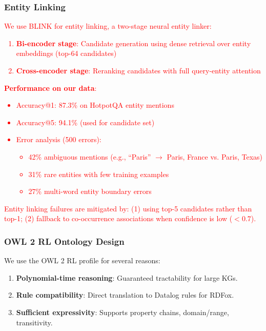 \documentclass[10pt,twocolumn]{article}
\newcommand{\revisioncritical}[1]{\textcolor{red}{#1}}
\begin{document}
\subsubsection{Entity Linking}
\label{sec:entity_linking}
\revisioncritical{

We use BLINK \cite{wu2020blink} for entity linking, a two-stage neural entity linker:

\begin{enumerate}
    \item \textbf{Bi-encoder stage}: Candidate generation using dense retrieval over entity embeddings (top-64 candidates)
    \item \textbf{Cross-encoder stage}: Reranking candidates with full query-entity attention
\end{enumerate}

\textbf{Performance on our data}:
\begin{itemize}
    \item Accuracy@1: 87.3\% on HotpotQA entity mentions
    \item Accuracy@5: 94.1\% (used for candidate set)
    \item Error analysis (500 errors):
    \begin{itemize}
        \item 42\% ambiguous mentions (e.g., ``Paris'' $\rightarrow$ Paris, France vs. Paris, Texas)
        \item 31\% rare entities with few training examples
        \item 27\% multi-word entity boundary errors
    \end{itemize}
\end{itemize}

Entity linking failures are mitigated by: (1) using top-5 candidates rather than top-1; (2) fallback to co-occurrence associations when confidence is low ($<0.7$).
}

\subsubsection{OWL 2 RL Ontology Design}
\label{sec:owl2rl}

We use the OWL 2 RL profile \cite{motik2012owl2} for several reasons:
\begin{enumerate}
    \item \textbf{Polynomial-time reasoning}: Guaranteed tractability for large KGs.
    \item \textbf{Rule compatibility}: Direct translation to Datalog rules for RDFox.
    \item \textbf{Sufficient expressivity}: Supports property chains, domain/range, transitivity.
\end{enumerate}
\end{document}
